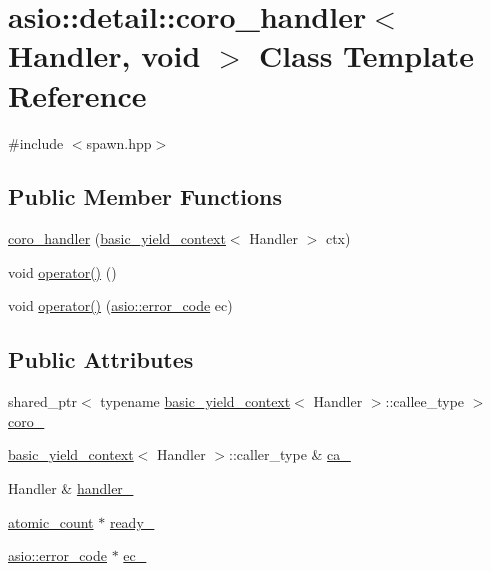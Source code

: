 \hypertarget{classasio_1_1detail_1_1coro__handler_3_01_handler_00_01void_01_4}{}\section{asio\+:\+:detail\+:\+:coro\+\_\+handler$<$ Handler, void $>$ Class Template Reference}
\label{classasio_1_1detail_1_1coro__handler_3_01_handler_00_01void_01_4}


{\ttfamily \#include $<$spawn.\+hpp$>$}

\subsection*{Public Member Functions}
\begin{DoxyCompactItemize}
\item 
\hyperlink{classasio_1_1detail_1_1coro__handler_3_01_handler_00_01void_01_4_abdb7f805c9b67da6800c0a1a0673bec8}{coro\+\_\+handler} (\hyperlink{classasio_1_1basic__yield__context}{basic\+\_\+yield\+\_\+context}$<$ Handler $>$ ctx)
\item 
void \hyperlink{classasio_1_1detail_1_1coro__handler_3_01_handler_00_01void_01_4_a7b5f6c3ee42d1596e93577617a85dce7}{operator()} ()
\item 
void \hyperlink{classasio_1_1detail_1_1coro__handler_3_01_handler_00_01void_01_4_ae71e62635d638e9a3b4340943b33d62c}{operator()} (\hyperlink{classasio_1_1error__code}{asio\+::error\+\_\+code} ec)
\end{DoxyCompactItemize}
\subsection*{Public Attributes}
\begin{DoxyCompactItemize}
\item 
shared\+\_\+ptr$<$ typename \hyperlink{classasio_1_1basic__yield__context}{basic\+\_\+yield\+\_\+context}$<$ Handler $>$\+::callee\+\_\+type $>$ \hyperlink{classasio_1_1detail_1_1coro__handler_3_01_handler_00_01void_01_4_ae5a8d2fe419cec49add65b2f41764d50}{coro\+\_\+}
\item 
\hyperlink{classasio_1_1basic__yield__context}{basic\+\_\+yield\+\_\+context}$<$ Handler $>$\+::caller\+\_\+type \& \hyperlink{classasio_1_1detail_1_1coro__handler_3_01_handler_00_01void_01_4_ab55025d81a89f6d47e5ed21a1df6db03}{ca\+\_\+}
\item 
Handler \& \hyperlink{classasio_1_1detail_1_1coro__handler_3_01_handler_00_01void_01_4_a207d28691946bae82598c715e8aa907c}{handler\+\_\+}
\item 
\hyperlink{namespaceasio_1_1detail_a75f94bf579dec2f59a0c4af6c4c3606e}{atomic\+\_\+count} $\ast$ \hyperlink{classasio_1_1detail_1_1coro__handler_3_01_handler_00_01void_01_4_aa491514a709f2438ba2994b0fb4304ad}{ready\+\_\+}
\item 
\hyperlink{classasio_1_1error__code}{asio\+::error\+\_\+code} $\ast$ \hyperlink{classasio_1_1detail_1_1coro__handler_3_01_handler_00_01void_01_4_a44744027260f8715b6f2e02a573b70dd}{ec\+\_\+}
\end{DoxyCompactItemize}


